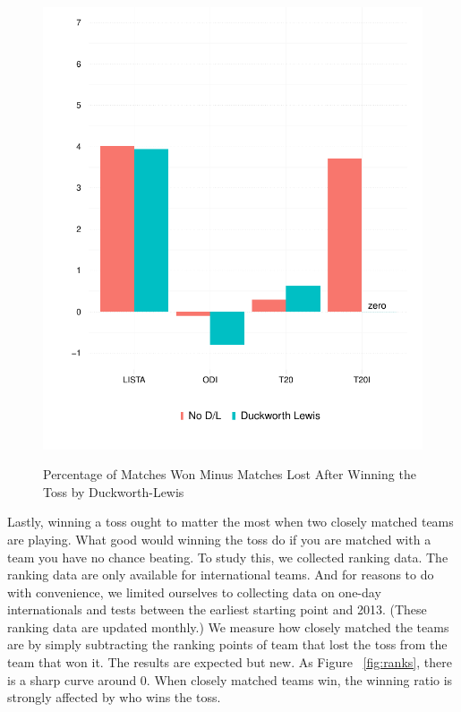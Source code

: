 \documentclass[12pt]{article}
\begin{document}
\begin{figure}[htbp]
\centering
\caption{Percentage of Matches Won Minus Matches Lost After Winning the Toss by Duckworth-Lewis}
\includegraphics[scale=.85]{../figs/winbyDL.pdf}
\label{fig:dl}
\end{figure}

Lastly, winning a toss ought to matter the most when two closely matched teams are playing. What good would winning the toss do if you are matched with a team you have no chance beating. To study this, we collected ranking data. The ranking data are only available for international teams. And for reasons to do with convenience, we limited ourselves to collecting data on one-day internationals and tests between the earliest starting point and 2013. (These ranking data are updated monthly.) We measure how closely matched the teams are by simply subtracting the ranking points of team that lost the toss from the team that won it. The results are expected but new. As Figure ~\ref{fig:ranks}, there is a sharp curve around 0. When closely matched teams win, the winning ratio is strongly affected by who wins the toss.
\end{document}
